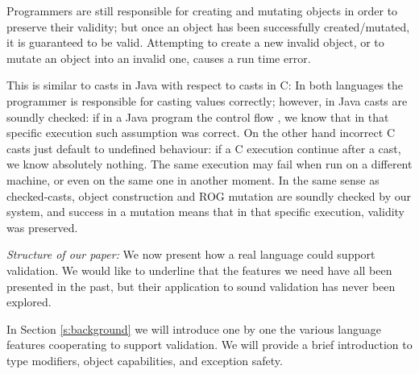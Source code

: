 Programmers are still responsible for creating and mutating objects in order to preserve their validity;
but once an object has been successfully created/mutated, it is guaranteed to be valid.
Attempting to create a new invalid object, or to mutate an object into an invalid one, causes
a run time error.

This is similar to casts in Java with respect to casts in C:
In both languages the programmer is responsible for casting values correctly;
however, in Java casts are soundly checked: if in a Java program the control flow ,
we know that in that specific
execution such assumption was correct.
On the other hand incorrect C casts just default to undefined behaviour:
if a C execution continue after a cast, we know absolutely nothing. The same execution
may fail when run on a different machine, 
or even on the same one in another moment.
In the same sense as checked-casts, object construction and ROG mutation are soundly checked by our system,
and success in a mutation means that in that specific execution, validity was preserved.




%
%  
% 
%
%
%
%
%
%
%
%
%
%
%
%
%
%
%
%
%



\noindent\textit{Structure of our paper:} We now present how a real language could support
validation. 
We would like to underline that the
features we need have all been presented in the past, but their application to sound validation has never been explored.

In Section \ref{s:background} we will introduce one by one the various
language features cooperating
to support validation. %
We will provide a brief introduction to type modifiers, object capabilities, and exception safety.

